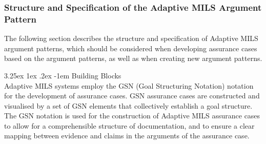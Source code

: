 \documentclass[12pt,twoside,a4paper]{article}
\makeatletter
\renewcommand\paragraph{\@startsection{paragraph}{5}{\z@}%
  {3.25ex \@plus1ex \@minus.2ex}%
  {-1em}%
  {\normalfont\normalsize\bfseries}}
\makeatother
\begin{document}
\subsubsection{Structure and Specification of the Adaptive MILS Argument Pattern}\label{sec:ap-rules}
The following section describes the structure and specification of Adaptive MILS argument patterns, which should be considered when developing assurance cases based on the argument patterns, as well as when creating new argument patterns. 

\paragraph{Building Blocks}\label{sec:buildingblocks}~\\
Adaptive MILS systems employ the GSN (Goal Structuring Notation) notation for the development of assurance cases. GSN assurance cases are constructed and visualised by a set of GSN elements that collectively establish a goal structure. The GSN notation is used for the construction of Adaptive MILS assurance cases to allow for a comprehensible structure of documentation, and to ensure a clear mapping between evidence and claims in the arguments of the assurance case. 
\end{document}
